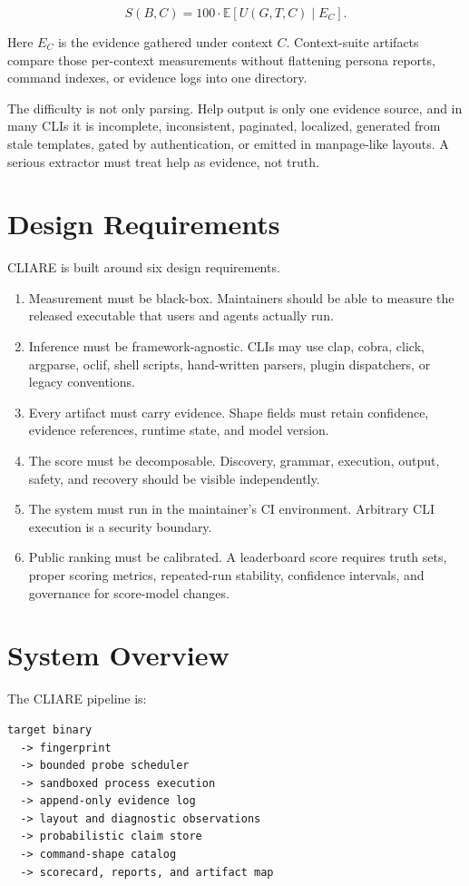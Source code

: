 \documentclass[11pt]{article}
\begin{document}
\[
S(B, C) = 100 \cdot \mathbb{E}[U(G, T, C) \mid E_C].
\]

Here \(E_C\) is the evidence gathered under context \(C\). Context-suite artifacts compare those per-context measurements without flattening persona reports, command indexes, or evidence logs into one directory.

The difficulty is not only parsing. Help output is only one evidence source, and in many CLIs it is incomplete, inconsistent, paginated, localized, generated from stale templates, gated by authentication, or emitted in manpage-like layouts. A serious extractor must treat help as evidence, not truth.

\section{Design Requirements}

CLIARE is built around six design requirements.

\begin{enumerate}
  \item Measurement must be black-box. Maintainers should be able to measure the released executable that users and agents actually run.
  \item Inference must be framework-agnostic. CLIs may use clap, cobra, click, argparse, oclif, shell scripts, hand-written parsers, plugin dispatchers, or legacy conventions.
  \item Every artifact must carry evidence. Shape fields must retain confidence, evidence references, runtime state, and model version.
  \item The score must be decomposable. Discovery, grammar, execution, output, safety, and recovery should be visible independently.
  \item The system must run in the maintainer's CI environment. Arbitrary CLI execution is a security boundary.
  \item Public ranking must be calibrated. A leaderboard score requires truth sets, proper scoring metrics, repeated-run stability, confidence intervals, and governance for score-model changes.
\end{enumerate}

\section{System Overview}

The CLIARE pipeline is:

\begin{verbatim}
target binary
  -> fingerprint
  -> bounded probe scheduler
  -> sandboxed process execution
  -> append-only evidence log
  -> layout and diagnostic observations
  -> probabilistic claim store
  -> command-shape catalog
  -> scorecard, reports, and artifact map
\end{verbatim}
\end{document}
